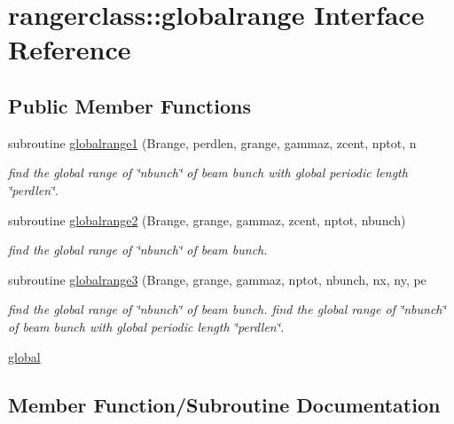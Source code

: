 \hypertarget{interfacerangerclass_1_1globalrange}{}\section{rangerclass\+::globalrange Interface Reference}
\label{interfacerangerclass_1_1globalrange}
\subsection*{Public Member Functions}
\begin{DoxyCompactItemize}
\item 
subroutine \mbox{\hyperlink{interfacerangerclass_1_1globalrange_a7ff5a58a120be444ab81bf7037c3785a}{globalrange1}} (Brange, perdlen, grange, gammaz, zcent, nptot, n
\begin{DoxyCompactList}\small\item\em find the global range of \char`\"{}nbunch\char`\"{} of beam bunch with global periodic length \char`\"{}perdlen\char`\"{}. \end{DoxyCompactList}\item 
subroutine \mbox{\hyperlink{interfacerangerclass_1_1globalrange_afead53eaf233bc999c94bcaf916eaaf8}{globalrange2}} (Brange, grange, gammaz, zcent, nptot, nbunch)
\begin{DoxyCompactList}\small\item\em find the global range of \char`\"{}nbunch\char`\"{} of beam bunch. \end{DoxyCompactList}\item 
subroutine \mbox{\hyperlink{interfacerangerclass_1_1globalrange_a5b959071ead119fc17254b0eb2ac8c28}{globalrange3}} (Brange, grange, gammaz, nptot, nbunch, nx, ny, pe
\begin{DoxyCompactList}\small\item\em find the global range of \char`\"{}nbunch\char`\"{} of beam bunch. find the global range of \char`\"{}nbunch\char`\"{} of beam bunch with global periodic length \char`\"{}perdlen\char`\"{}. \end{DoxyCompactList}\item 
\mbox{\hyperlink{interfacerangerclass_1_1globalrange_a9d8e09cb7bec50dfaaf221874f63b578}{global}}
\end{DoxyCompactItemize}


\subsection{Member Function/\+Subroutine Documentation}
\mbox{\label{interfacerangerclass_1_1globalrange_a9d8e09cb7bec50dfaaf221874f63b578}} 
